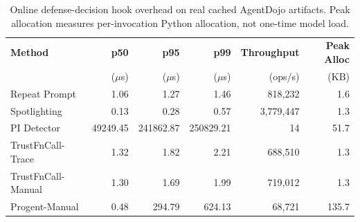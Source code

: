 \begin{table}[t]
\centering
\caption{Online defense-decision hook overhead on real cached AgentDojo artifacts. Peak allocation measures per-invocation Python allocation, not one-time model load.}
\label{tab:system-hook-summary}
\small
\begin{tabular}{lrrrrr}
\toprule
\textbf{Method} & \textbf{p50} & \textbf{p95} & \textbf{p99} & \textbf{Throughput} & \textbf{Peak Alloc} \\
 & ($\mu$s) & ($\mu$s) & ($\mu$s) & (ops/s) & (KB) \\
\midrule
Repeat Prompt & 1.06 & 1.27 & 1.46 & 818,232 & 1.6 \\
Spotlighting & 0.13 & 0.28 & 0.57 & 3,779,447 & 1.3 \\
PI Detector & 49249.45 & 241862.87 & 250829.21 & 14 & 51.7 \\
TrustFnCall-Trace & 1.32 & 1.82 & 2.21 & 688,510 & 1.3 \\
TrustFnCall-Manual & 1.30 & 1.69 & 1.99 & 719,012 & 1.3 \\
Progent-Manual & 0.48 & 294.79 & 624.13 & 68,721 & 135.7 \\
\bottomrule
\end{tabular}
\end{table}
